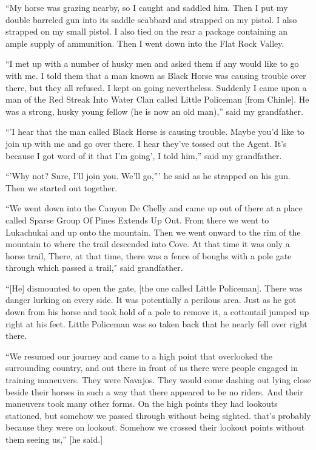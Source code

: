``My horse was grazing nearby, so I caught and saddled him. Then I put my double barreled gun into its saddle scabbard and strapped on my pistol. I also strapped on my small pistol. I also tied on the rear a package containing an ample supply of ammunition. Then I went down into the Flat Rock Valley.

``I met up with a number of husky men and asked them if any would like to go with me. I told them that a man known as Black Horse was causing trouble over there, but they all refused. I kept on going nevertheless. Suddenly I came upon a man of the Red Streak Into Water Clan called Little Policeman [from Chinle]. He was a strong, husky young fellow (he is now an old man),'' said my grandfather.

``'I hear that the man called Black Horse is causing trouble. Maybe you'd like to join up with me and go over there. I hear they've tossed out the Agent. It's because I got word of it that I'm going', I told him,'' said my grandfather.

``'Why not? Sure, I'll join you. We'll go,''' he said as he strapped on his gun. Then we started out together.

``We went down into the Canyon De Chelly and came up out of there at a place called Sparse Group Of Pines Extends Up Out. From there we went to Lukachukai and up onto the mountain. Then we went onward to the rim of the mountain to where the trail descended into Cove. At that time it was only a horse trail, There, at that time, there was a fence of boughs with a pole gate through which passed a trail," said grandfather.

``[He] dismounted to open the gate, [the one called Little Policeman]. There was danger lurking on every side. It was potentially a perilous area. Just as he got down from his horse and took hold of a pole to remove it, a cottontail jumped up right at his feet. Little Policeman was so taken back that he nearly fell over right there.

``We resumed our journey and came to a high point that overlooked the surrounding country, and out there in front of us there were people engaged in training maneuvers. They were Navajos. They would come dashing out lying close beside their horses in such a way that there appeared to be no riders. And their maneuvers took many other forms. On the high points they had lookouts stationed, but somehow we passed through without being sighted. that's probably because they were on lookout. Somehow we crossed their lookout points without them seeing us,'' [he said.]

